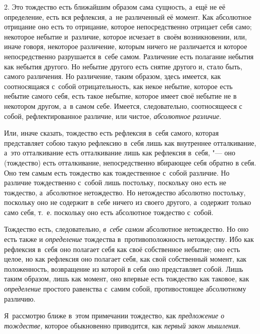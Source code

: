 2. Это тождество есть ближайшим образом сама сущность, а~ещё не её
определение, есть вся рефлексия, а~не различенный её момент. Как абсолютное
отрицание оно есть то отрицание, которое непосредственно отрицает себя
само; некоторое небытие и~различие, которое исчезает в~своём возникновении,
или, иначе говоря, некоторое различение, которым ничего не различается и
которое непосредственно разрушается в~себе самом. Различение есть полагание
небытия как небытия другого. Но небытие другого есть снятие другого и,
стало быть, самого различения. Но различение, таким образом, здесь имеется,
как соотносящаяся с~собой отрицательность, как некое небытие, которое есть
небытие самого себя, есть такое небытие, которое имеет своё небытие не в
некотором другом, а~в самом себе. Имеется, следовательно, соотносящееся с
собой, рефлектированное различие, или чистое,
{\em абсолютное различие}.

Или, иначе сказать, тождество есть рефлексия в~себя самого, которая
представляет собою такую рефлексию в~себя лишь как внутреннее отталкивание,
а~это отталкивание есть отталкивание лишь как рефлексия в~себя, "--- оно
(тождество) есть отталкивание, непосредственно вбирающее себя обратно в
себя. Оно тем самым есть тождество как тождественное с~собой различие. Но
различие тождественно с~собой лишь постольку, поскольку оно есть не
тождество, а~абсолютное нетождество. Но нетождество абсолютно постольку,
поскольку оно не содержит в~себе ничего из своего другого, а~содержит
только само себя, т.~е. поскольку оно есть абсолютное тождество с~собой.

Тождество есть, следовательно, {\em в~себе самом}
абсолютное нетождество. Но оно есть также и
{\em определение} тождества в~противоположность
нетождеству. Ибо как рефлексия в~себя оно полагает себя как своё
собственное небытие; оно есть целое, но как рефлексия оно полагает себя,
как свой собственный момент, как положенность, возвращение из которой в
себя оно представляет собой. Лишь таким образом, лишь как момент, оно
впервые есть тождество как таковое, как
{\em определение} простого равенства с~самим собой,
противостоящее абсолютному различию.


Я~рассмотрю ближе в~этом примечании тождество, как {\em предложение о
тождестве,} которое обыкновенно приводится, как {\em первый закон мышления}.

